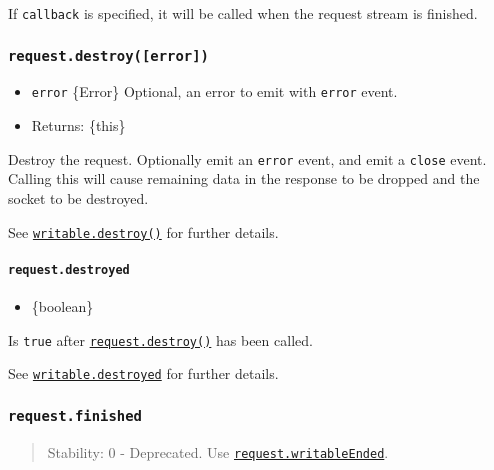 If \texttt{callback} is specified, it will be called when the request
stream is finished.

\subsubsection{\texorpdfstring{\texttt{request.destroy({[}error{]})}}{request.destroy({[}error{]})}}\label{request.destroyerror}

\begin{itemize}
\tightlist
\item
  \texttt{error} \{Error\} Optional, an error to emit with
  \texttt{\textquotesingle{}error\textquotesingle{}} event.
\item
  Returns: \{this\}
\end{itemize}

Destroy the request. Optionally emit an
\texttt{\textquotesingle{}error\textquotesingle{}} event, and emit a
\texttt{\textquotesingle{}close\textquotesingle{}} event. Calling this
will cause remaining data in the response to be dropped and the socket
to be destroyed.

See \href{stream.md\#writabledestroyerror}{\texttt{writable.destroy()}}
for further details.

\paragraph{\texorpdfstring{\texttt{request.destroyed}}{request.destroyed}}\label{request.destroyed}

\begin{itemize}
\tightlist
\item
  \{boolean\}
\end{itemize}

Is \texttt{true} after
\hyperref[requestdestroyerror]{\texttt{request.destroy()}} has been
called.

See \href{stream.md\#writabledestroyed}{\texttt{writable.destroyed}} for
further details.

\subsubsection{\texorpdfstring{\texttt{request.finished}}{request.finished}}\label{request.finished}

\begin{quote}
Stability: 0 - Deprecated. Use
\hyperref[requestwritableended]{\texttt{request.writableEnded}}.
\end{quote}

